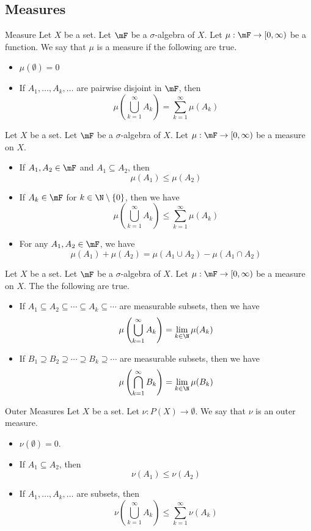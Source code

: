 \documentclass[a4paper]{article}
\begin{document}
\subsection{Measures}
\begin{defn}{Measure}{} Let $X$ be a set. Let $\mF$ be a $\sigma$-algebra of $X$. Let $\mu:\mF\to[0,\infty)$ be a function. We say that $\mu$ is a measure if the following are true. 
\begin{itemize}
\item $\mu(\emptyset)=0$
\item If $A_1,\dots,A_k,\dots$ are pairwise disjoint in $\mF$, then $$\mu\left(\bigcup_{k=1}^\infty A_k\right)=\sum_{k=1}^\infty\mu(A_k)$$
\end{itemize}
\end{defn}

\begin{prp}{}{} Let $X$ be a set. Let $\mF$ be a $\sigma$-algebra of $X$. Let $\mu:\mF\to[0,\infty)$ be a measure on $X$. 
\begin{itemize}
\item If $A_1,A_2\in\mF$ and $A_1\subseteq A_2$, then $$\mu(A_1)\leq\mu(A_2)$$
\item If $A_k\in\mF$ for $k\in\N\setminus\{0\}$, then we have $$\mu\left(\bigcup_{k=1}^\infty A_k\right)\leq\sum_{k=1}^\infty\mu(A_k)$$
\item For any $A_1,A_2\in\mF$, we have $$\mu(A_1)+\mu(A_2)=\mu(A_1\cup A_2)-\mu(A_1\cap A_2)$$
\end{itemize}
\end{prp}

\begin{prp}{}{} Let $X$ be a set. Let $\mF$ be a $\sigma$-algebra of $X$. Let $\mu:\mF\to[0,\infty)$ be a measure on $X$. The the following are true. 
\begin{itemize}
\item If $A_1\subseteq A_2\subseteq\cdots\subseteq A_k\subseteq\cdots$ are measurable subsets, then we have $$\mu\left(\bigcup_{k=1}^\infty A_k\right)=\lim_{k\in\N}\mu(A_k)$$
\item If $B_1\supseteq B_2\supseteq\cdots\supseteq B_k\supseteq\cdots$ are measurable subsets, then we have $$\mu\left(\bigcap_{k=1}^\infty B_k\right)=\lim_{k\in\N}\mu(B_k)$$
\end{itemize}
\end{prp}

\begin{defn}{Outer Measures}{} Let $X$ be a set. Let $\nu:P(X)\to\emptyset$. We say that $\nu$ is an outer measure. 
\begin{itemize}
\item $\nu(\emptyset)=0$. 
\item If $A_1\subseteq A_2$, then $$\nu(A_1)\leq\nu(A_2)$$
\item If $A_1,\dots,A_k,\dots$ are subsets, then $$\nu\left(\bigcup_{k=1}^\infty A_k\right)\leq\sum_{k=1}^\infty\nu(A_k)$$
\end{itemize}
\end{defn}
\end{document}
